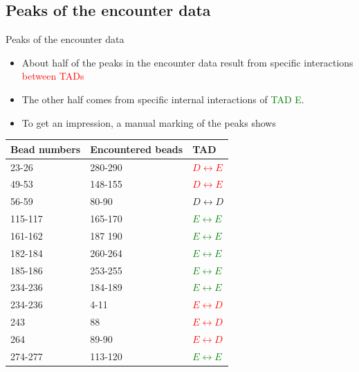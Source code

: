\documentclass[8pt]{beamer}
\begin{document}
\subsection{Peaks of the encounter data}
\begin{frame}{Peaks of the encounter data}
\begin{itemize}
\item About half of the peaks in the encounter data result from specific interactions \textcolor{red}{between TADs}
\item The other half comes from specific internal interactions of \textcolor{green}{TAD E}.
\item To get an impression, a manual marking of the peaks shows 
\end{itemize}
\begin{table}[H]\label{nonNeighborBeadEncounterTable}
\begin{tabular}{l l l}
Bead numbers & Encountered beads & TAD\\
\hline

23-26   & 280-290 & \textcolor{red}{$D\leftrightarrow E$}\\
49-53   & 148-155 & \textcolor{red}{$D\leftrightarrow E$}\\
56-59   & 80-90   & $D\leftrightarrow D$\\
115-117 & 165-170 & \textcolor{green}{$E\leftrightarrow E$}\\
161-162 & 187 190 & \textcolor{green}{$E\leftrightarrow E$}\\
182-184 & 260-264 & \textcolor{green}{$E\leftrightarrow E$}\\
185-186 & 253-255 & \textcolor{green}{$E\leftrightarrow E$}\\
234-236 & 184-189 & \textcolor{green}{$E\leftrightarrow E$}\\
234-236 & 4-11    & \textcolor{red}{$E\leftrightarrow D$}\\
243     & 88      & \textcolor{red}{$E\leftrightarrow D$}\\
264     & 89-90   & \textcolor{red}{$E\leftrightarrow D$}\\
274-277 & 113-120 & \textcolor{green}{$E\leftrightarrow E$}
\end{tabular}
\end{table} 
\end{frame}
\end{document}
